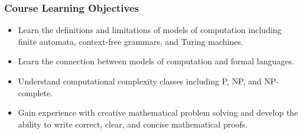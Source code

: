 \documentclass[10pt]{article}
\begin{document}
\subsubsection*{Course Learning Objectives}

\begin{itemize}
\item Learn the definitions and limitations of models of computation including finite automata, context-free grammars, and Turing machines.
\item Learn the connection between models of computation and formal languages.  
\item Understand computational complexity classes including P, NP, and NP-complete.
\item Gain experience with creative mathematical problem solving and develop the ability to write correct, clear, and concise mathematical proofs.
\end{itemize}

%
%
%
\end{document}
